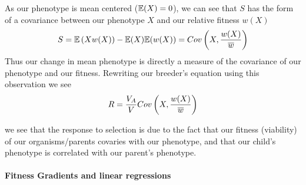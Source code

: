 As our phenotype is mean centered ($\mathbb{E}(X)=0$), we can see that $S$ has
the form of a covariance between our phenotype $X$ and our relative fitness
$w(X)$
\begin{equation}
  S =  \mathbb{E} \left (X
  w(X) \right) -\mathbb{E}(X)\mathbb{E}(w(X)) =Cov \left(X, \frac{w(X)}{\overline{w}} \right) \label{S_covar}
\end{equation}
  Thus our change in mean phenotype is directly a measure of the
  covariance of our phenotype and our fitness. 
  Rewriting our breeder's
equation using this observation we see
\begin{equation}
R = \frac{V_A}{V}  Cov \left(X, \frac{w(X)}{\overline{w}} \right)  
\end{equation}

we see that the response to selection is due to the fact that our
fitness (viability) of our organisms/parents covaries with our phenotype, and
that our child's phenotype is correlated with our parent's phenotype. 


\paragraph{Fitness Gradients and linear regressions}


